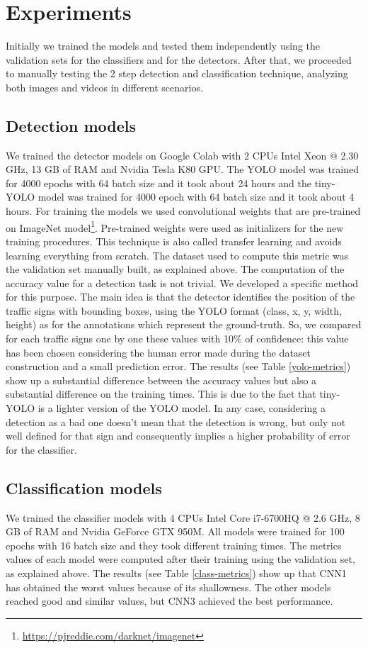 \documentclass[10pt,twocolumn,letterpaper]{article}
\begin{document}
\section{Experiments}
Initially we trained the models and tested them independently using the validation sets for the classifiers and for the detectors. After that, we proceeded to manually testing the 2 step detection and classification technique, analyzing both images and videos in different scenarios. 


\subsection{Detection models}
We trained the detector models on Google Colab with 2 CPUs Intel Xeon @ 2.30 GHz, 13 GB of RAM and Nvidia Tesla K80 GPU. The YOLO model was trained for 4000 epochs with 64 batch size and it took about 24 hours and the tiny-YOLO model was trained for 4000 epoch with 64 batch size and it took about 4 hours.
For training  the models we used convolutional weights that are pre-trained on ImageNet model\footnote{\url{https://pjreddie.com/darknet/imagenet}}. Pre-trained weights were used as initializers for the new training procedures. This technique is also called transfer learning and avoids learning everything from scratch. The dataset used to compute this metric was the validation set manually built, as explained above. The computation of the accuracy value for a detection task is not trivial. We developed a specific method for this purpose. The main idea is that the detector identifies the position of the traffic signs with bounding boxes, using the YOLO format (class, x, y, width, height) as for the annotations which represent the ground-truth. So, we compared for each traffic signs one by one these values with 10\% of confidence: this value has been chosen considering the human error made during the dataset construction and a small prediction error. 
The results (see Table \ref{yolo-metrics}) show up a substantial difference between the accuracy values but also a substantial difference on the training times. This is due to the fact that tiny-YOLO is a lighter version of the YOLO model. In any case, considering a detection as a bad one doesn't mean that the detection is wrong, but only not well defined for that sign and consequently implies a higher probability of error for the classifier.


\subsection{Classification models}
We trained the classifier models with 4 CPUs Intel Core i7-6700HQ @ 2.6 GHz, 8 GB of RAM and Nvidia GeForce GTX 950M. All models were trained for 100 epochs with 16 batch size and they took different training times. The metrics values of each model were computed after their training using the validation set, as explained above. The results (see Table \ref{class-metrics}) show up that CNN1 has obtained the worst values because of its shallowness. The other models reached good and similar values, but CNN3 achieved the best performance.
\end{document}
